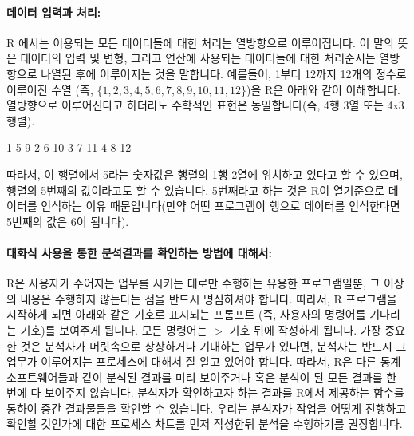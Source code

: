 \paragraph{데이터 입력과 처리:}  
R 에서는 이용되는 모든 데이터들에 대한 처리는 열방향으로 이루어집니다.
이 말의 뜻은 데이터의 입력 및 변형, 그리고 연산에 사용되는 데이터들에 대한 처리순서는 열방향으로 나열된 후에 이루어지는 것을 말합니다. 
예를들어, 1부터 12까지 12개의 정수로 이루어진 수열 (즉, $\{ 1, 2, 3, 4, 5, 6, 7, 8, 9, 10, 11, 12 \}$)을 R은 아래와 같이 이해합니다. 
열방향으로 이루어진다고 하더라도 수학적인 표현은 동일합니다(즉, 4행 3열 또는 4x3 행렬).
%
%
\begin{Schunk}
\begin{Soutput}
1  5   9
2  6  10
3  7  11
4  8  12
\end{Soutput}
\end{Schunk}
%
따라서, 이 행렬에서 5라는 숫자값은 행렬의 1행 2열에 위치하고 있다고 할 수 있으며, 행렬의 5번째의 값이라고도 할 수 있습니다. 5번째라고 하는 것은 R이 열기준으로 데이터를 인식하는 이유 때문입니다(만약 어떤 프로그램이 행으로 데이터를 인식한다면 5번째의 값은 6이 됩니다). 

\paragraph{대화식 사용을 통한 분석결과를 확인하는 방법에 대해서:} 
R은 사용자가 주어지는 업무를 시키는 대로만 수행하는 유용한 프로그램일뿐, 그 이상의 내용은 수행하지 않는다는 점을 반드시 명심하셔야 합니다. 
따라서, R 프로그램을 시작하게 되면 아래와 같은 기호로 표시되는 프롬프트 (즉, 사용자의 명령어를 기다리는 기호)를 보여주게 됩니다. 
모든 명령어는 $>$ 기호 뒤에 작성하게 됩니다.  
가장 중요한 것은 분석자가 머릿속으로 상상하거나 기대하는 업무가 있다면, 분석자는 반드시 그 업무가 이루어지는 프로세스에 대해서 잘 알고 있어야 합니다.
따라서, R은 다른 통계 소프트웨어들과 같이 분석된 결과를 미리 보여주거나 혹은 분석이 된 모든 결과를 한 번에 다 보여주지 않습니다.
분석자가 확인하고자 하는 결과를 R에서 제공하는 함수를 통하여 중간 결과물들을 확인할 수 있습니다. 
우리는 분석자가 작업을 어떻게 진행하고 확인할 것인가에 대한 프로세스 차트를 먼저 작성한뒤 분석을 수행하기를 권장합니다.
%


